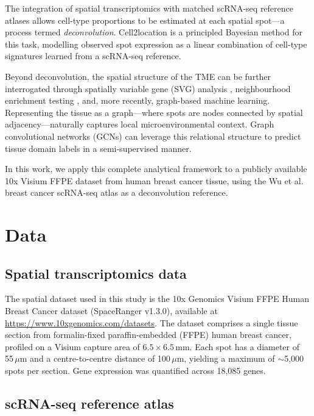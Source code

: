 \documentclass[12pt, a4paper]{article}
\begin{document}
The integration of spatial transcriptomics with matched scRNA-seq reference atlases allows cell-type proportions to be estimated at each spatial spot—a process termed \emph{deconvolution}. Cell2location \citep{kleshchevnikov2022} is a principled Bayesian method for this task, modelling observed spot expression as a linear combination of cell-type signatures learned from a scRNA-seq reference.

Beyond deconvolution, the spatial structure of the TME can be further interrogated through spatially variable gene (SVG) analysis \citep{moran1950}, neighbourhood enrichment testing \citep{palla2022}, and, more recently, graph-based machine learning. Representing the tissue as a graph—where spots are nodes connected by spatial adjacency—naturally captures local microenvironmental context. Graph convolutional networks (GCNs) \citep{kipf2017} can leverage this relational structure to predict tissue domain labels in a semi-supervised manner.

In this work, we apply this complete analytical framework to a publicly available 10x Visium FFPE dataset from human breast cancer tissue, using the Wu et al. \citeyearpar{wu2021} breast cancer scRNA-seq atlas as a deconvolution reference.

\section{Data}

\subsection{Spatial transcriptomics data}

The spatial dataset used in this study is the 10x Genomics Visium FFPE Human Breast Cancer dataset (SpaceRanger v1.3.0), available at \url{https://www.10xgenomics.com/datasets}. The dataset comprises a single tissue section from formalin-fixed paraffin-embedded (FFPE) human breast cancer, profiled on a Visium capture area of $6.5 \times 6.5$\,mm. Each spot has a diameter of 55\,$\mu$m and a centre-to-centre distance of 100\,$\mu$m, yielding a maximum of $\sim$5,000 spots per section. Gene expression was quantified across 18,085 genes.

\subsection{scRNA-seq reference atlas}
\end{document}
